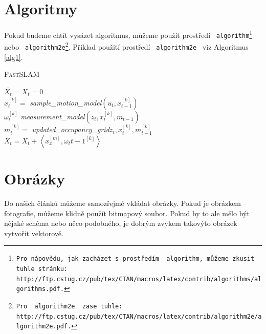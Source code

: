 \documentclass[a4paper, 11pt]{article}
\begin{document}
\newpage

\section{Algoritmy \label{algoritmy}} 

Pokud budeme chtít vysázet algoritmus, můžeme použít prostředí \texttt{ algorithm\footnote{Pro nápovědu, jak zacházet s~prostředím \texttt{ algorithm}, můžeme zkusit tuhle stránku: \\
				http://ftp.cstug.cz/pub/tex/CTAN/macros/latex/contrib/algorithms/algorithms.pdf.} } nebo \texttt{ algorithm2e\footnote{Pro \texttt{ algorithm2e } zase tuhle:
		http://ftp.cstug.cz/pub/tex/CTAN/macros/latex/contrib/algorithm2e/algorithm2e.pdf.}}.
Příklad použití prostředí \texttt{ algorithm2e } viz Algoritmus \ref{alg1}.

\begin{algorithm}[h]
	\caption{\textsc{Fast}SLAM\label{alg1}}
	\SetNlSty{}{}{:}
	$\overline{X_t} = X_t = 0$ \\
		{$x_t^{[k]}=$ \emph{sample\_motion\_model}$(u_t,x_{t-1}^{[k]})$\\
		$\omega_t^{[k]}$ \emph{measurement\_model}$(z_t,x_t^{[k]},m_{t-1})$ \\
		$m_t^{[k]} =$ \emph{updated\_occupancy\_grid}$z_t,x_t^{[k]},m_{t-1}^{[k]}$ \\
		$\overline{X_t} = \overline{X_t} + \left <x_x^{[m]},\omega_t{t-1}^{[k]}\right >$
	    }	
\end{algorithm}

\section{Obrázky}

Do našich článků můžeme samozřejmě vkládat obrázky. Pokud je obrázkem fotografie,
můžeme klidně použít bitmapový soubor. Pokud by to ale mělo být nějaké schéma nebo
něco podobného, je dobrým zvykem takovýto obrázek vytvořit vektorově.
\end{document}
